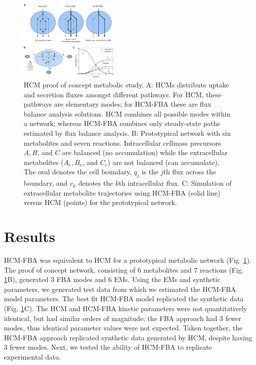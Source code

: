 \documentclass[10pt,twocolumn,twoside,final]{IEEEtran}
\begin{document}

\begin{figure}[!t]\centering
\includegraphics[width=0.43\textwidth]{./figs/Fig-1-Method-General.pdf}
\caption{HCM proof of concept metabolic study.
A: HCMs distribute uptake and secretion fluxes amongst different pathways. For HCM, these pathways are elementary modes; for HCM-FBA these are flux balance analysis solutions.
HCM combines all possible modes within a network; whereas HCM-FBA combines only steady-state paths estimated by flux balance analysis.
B: Prototypical network with six metabolites and seven reactions.
Intracellular cellmass precursors $A,B$, and $C$ are balanced (no accumulation) while the extracellular metabolites ($A_{e},B_{e}$, and $C_{e}$) are not balanced (can accumulate).
The oval denotes the cell boundary, $q_{j}$ is the $j$th flux across the boundary, and $v_{k}$ denotes the $k$th intracellular flux.
C: Simulation of extracellular metabolite trajectories using HCM-FBA (solid line) versus HCM (points) for the prototypical network.
}\label{fig:model-fitting}
\end{figure}

\section{Results}
HCM-FBA was equivalent to HCM for a prototypical metabolic network (Fig. \ref{fig:model-fitting}).
The proof of concept network, consisting of 6 metabolites and 7 reactions (Fig. \ref{fig:model-fitting}B), generated 3 FBA modes and 6 EMs.
Using the EMs and synthetic parameters, we generated test data from which we estimated the HCM-FBA model parameters.
The best fit HCM-FBA model replicated the synthetic data (Fig. \ref {fig:model-fitting}C).
The HCM and HCM-FBA kinetic parameters were not quantitatively identical, but had similar orders of magnitude;
the FBA approach had 3 fewer modes, thus identical parameter values were not expected.
Taken together, the HCM-FBA approach replicated synthetic data generated by HCM, despite having 3 fewer modes.
Next, we tested the ability of HCM-FBA to replicate experimental data.
\end{document}
